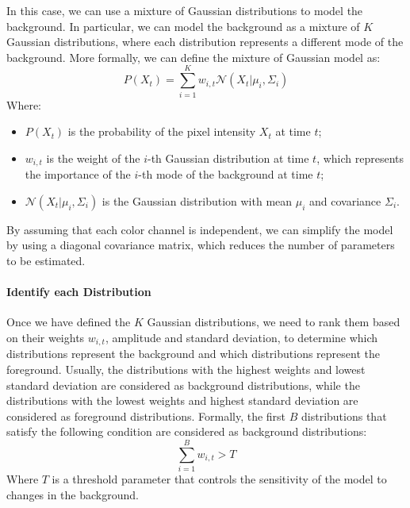 In this case, we can use a mixture of Gaussian distributions to model the background.
In particular, we can model the background as a mixture of $K$ Gaussian distributions, where each distribution represents a different mode of the background.
More formally, we can define the mixture of Gaussian model as:
\begin{equation}
    P(X_t) = \sum_{i=1}^{K} w_{i,t} \mathcal{N}(X_t | \mu_i, \Sigma_i)
\end{equation}
Where:
\begin{itemize}
    \item $P(X_t)$ is the probability of the pixel intensity $X_t$ at time $t$;
    \item $w_{i,t}$ is the weight of the $i$-th Gaussian distribution at time $t$, which represents the importance of the $i$-th mode of the background at time $t$;
    \item $\mathcal{N}(X_t | \mu_i, \Sigma_i)$ is the Gaussian distribution with mean $\mu_i$ and covariance $\Sigma_i$.
\end{itemize}
By assuming that each color channel is independent, we can simplify the model by using a diagonal covariance matrix, which reduces the number of parameters to be estimated.

\paragraph{Identify each Distribution}
Once we have defined the $K$ Gaussian distributions, we need to rank them based on their weights $w_{i,t}$, amplitude and standard deviation, to determine which distributions represent the background and which distributions represent the foreground.
Usually, the distributions with the highest weights and lowest standard deviation are considered as background distributions, while the distributions with the lowest weights and highest standard deviation are considered as foreground distributions.
Formally, the first $B$ distributions that satisfy the following condition are considered as background distributions:
\begin{equation}
    \sum_{i=1}^{B} w_{i,t} > T
\end{equation}
Where $T$ is a threshold parameter that controls the sensitivity of the model to changes in the background.

